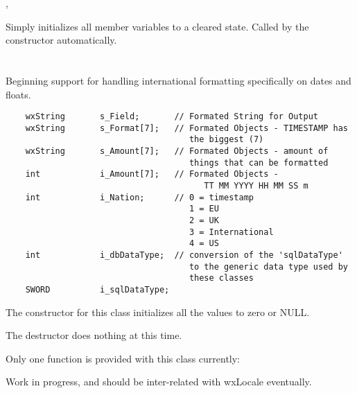 
, 


\label{wxdbcoldefinitialize}

Simply initializes all member variables to a cleared state.  Called by 
the constructor automatically.


\section{}\label{wxdbcolfor}

Beginning support for handling international formatting specifically on dates 
and floats.  

\begin{verbatim}
    wxString       s_Field;       // Formated String for Output
    wxString       s_Format[7];   // Formated Objects - TIMESTAMP has 
                                     the biggest (7)
    wxString       s_Amount[7];   // Formated Objects - amount of 
                                     things that can be formatted
    int            i_Amount[7];   // Formated Objects - 
                                        TT MM YYYY HH MM SS m
    int            i_Nation;      // 0 = timestamp
                                     1 = EU
                                     2 = UK
                                     3 = International
                                     4 = US
    int            i_dbDataType;  // conversion of the 'sqlDataType'
                                     to the generic data type used by
                                     these classes
    SWORD          i_sqlDataType;
\end{verbatim}

The constructor for this class initializes all the values to zero or NULL.

The destructor does nothing at this time.

Only one function is provided with this class currently:


\label{wxdbcolforformat}

\label{wxdbcolforformat}

Work in progress, and should be inter-related with wxLocale eventually.



